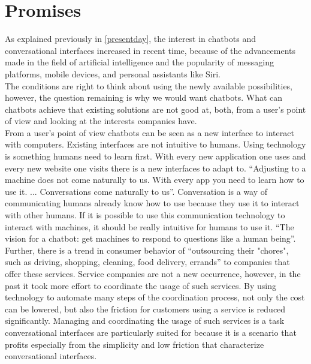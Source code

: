 \section{Promises}


As explained previously in \ref{presentday}, the interest in chatbots and conversational interfaces increased in recent time, because of the advancements made in the field of artificial intelligence and the popularity of messaging platforms, mobile devices, and personal assistants like Siri.
\\
The conditions are right to think about using the newly available possibilities, however, the question remaining is why we would want chatbots. What can chatbots achieve that existing solutions are not good at, both, from a user's point of view and looking at the interests companies have.
\\

From a user's point of view chatbots can be seen as a new interface to interact with computers.
Existing interfaces are not intuitive to humans. Using technology is something humans need to learn first.
With every new application one uses and every new website one visits there is a new interfaces to adapt to.
``Adjusting to a machine does not come naturally to us. With every app you need to learn how to use it. ... Conversations come naturally to us''\cite{techinasia}.
Conversation is a way of communicating humans already know how to use because they use it to interact with other humans.
If it is possible to use this communication technology to interact with machines, it should be really intuitive for humans to use it.
``The vision for a chatbot: get machines to respond to questions like a human being''\cite{techinasia}.
\\

Further, there is a trend in consumer behavior of ``outsourcing their "chores", such as driving, shopping, cleaning, food delivery, errands''\cite{chatbotbook} to companies that offer these services.
Service companies are not a new occurrence, however, in the past it took more effort to coordinate the usage of such services.
By using technology to automate many steps of the coordination process, not only the cost can be lowered, but also the friction for customers using a service is reduced significantly.
Managing and coordinating the usage of such services is a task conversational interfaces are particularly suited for because it is a scenario that profits especially from the simplicity and low friction that characterize conversational interfaces.
\\

